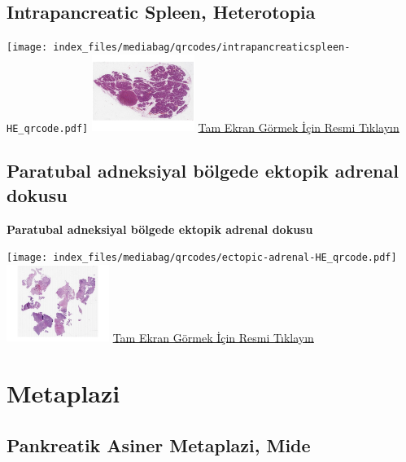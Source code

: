 \documentclass[
  letterpaper,
  DIV=11,
  numbers=noendperiod]{scrreprt}
\begin{document}
\hypertarget{sec-intrapancreatic-spleen}{%
\section{Intrapancreatic Spleen,
Heterotopia}\label{sec-intrapancreatic-spleen}}

\texttt{[image: index\_files/mediabag/qrcodes/intrapancreaticspleen-HE\_qrcode.pdf]}
\href{https://images.patolojiatlasi.com/intrapancreaticspleen/HE.html}{\includegraphics[width=0.25\textwidth,height=\textheight]{./screenshots/thumbnail_intrapancreaticspleen.png}}
\href{https://images.patolojiatlasi.com/intrapancreaticspleen/HE.html}{Tam
Ekran Görmek İçin Resmi Tıklayın}

\hypertarget{sec-paratubal-adneksiyal-bolgede-ektopik-adrenal}{%
\section{Paratubal adneksiyal bölgede ektopik adrenal
dokusu}\label{sec-paratubal-adneksiyal-bolgede-ektopik-adrenal}}

\textbf{Paratubal adneksiyal bölgede ektopik adrenal dokusu}

\texttt{[image: index\_files/mediabag/qrcodes/ectopic-adrenal-HE\_qrcode.pdf]}
\href{https://images.patolojiatlasi.com/ectopic-adrenal/HE.html}{\includegraphics[width=0.25\textwidth,height=\textheight]{./screenshots/thumbnail_ectopic-adrenal.png}}
\href{https://images.patolojiatlasi.com/ectopic-adrenal/HE.html}{Tam
Ekran Görmek İçin Resmi Tıklayın}

\hypertarget{sec-metaplazi}{%
\chapter{Metaplazi}\label{sec-metaplazi}}

\hypertarget{sec-pankreatik-asiner-metaplazi}{%
\section{Pankreatik Asiner Metaplazi,
Mide}\label{sec-pankreatik-asiner-metaplazi}}
\end{document}
